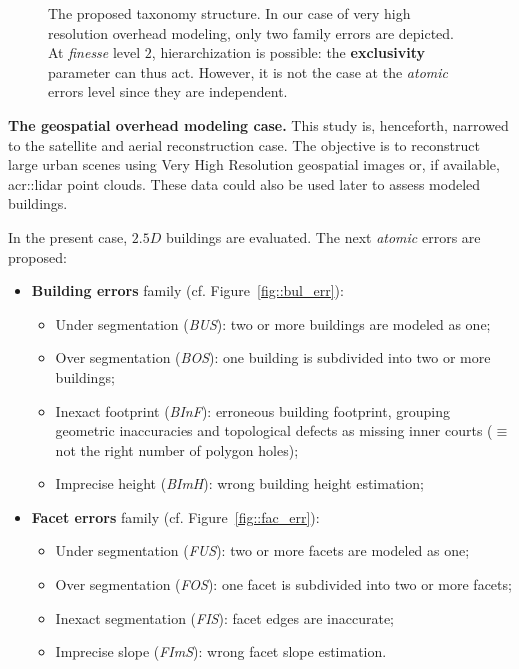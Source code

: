 \documentclass[runningheads]{llncs}
\begin{document}
	\begin{figure}
        \begin{center}
            
            \vspace{-1.1cm}
            \caption{\label{fig::taxonomy} The proposed taxonomy structure. In our case of very high resolution overhead modeling, only two family errors are depicted. At \textit{finesse} level $2$, hierarchization is possible: the \textbf{exclusivity} parameter can thus act. However, it is not the case at the \textit{atomic} errors level since they are independent. }
        \end{center}
    \end{figure}
\noindent
\textbf{The geospatial overhead modeling case.}
This study is, henceforth, narrowed to the satellite and aerial reconstruction case. The objective is to reconstruct large urban scenes using Very High Resolution geospatial images or, if available, \acrshort{acr::lidar} point clouds. These data could also be used later to assess modeled buildings.

In the present case, $2.5D$ buildings are evaluated. The next \textit{atomic} errors are proposed:
	\begin{itemize}
		\item \textbf{Building errors} family (cf. Figure~\ref{fig::bul_err}):
        \begin{itemize}
        	\item Under segmentation (\textit{BUS}): two or more buildings are modeled as one;
            \item Over segmentation (\textit{BOS}): one building is subdivided into two or more buildings;
            \item Inexact footprint (\textit{BInF}): erroneous building footprint, grouping geometric inaccuracies and topological defects as missing inner courts ($\equiv$ not the right number of polygon holes);
            \item Imprecise height (\textit{BImH}): wrong building height estimation;
        \end{itemize}
		\item \textbf{Facet errors} family (cf. Figure~\ref{fig::fac_err}):
        \begin{itemize}
        	\item Under segmentation (\textit{FUS}): two or more facets are modeled as one;
            \item Over segmentation (\textit{FOS}): one facet is subdivided into two or more facets;
            \item Inexact segmentation (\textit{FIS}): facet edges are inaccurate;
            \item Imprecise slope (\textit{FImS}): wrong facet slope estimation.
        \end{itemize}
	\end{itemize}
\end{document}
